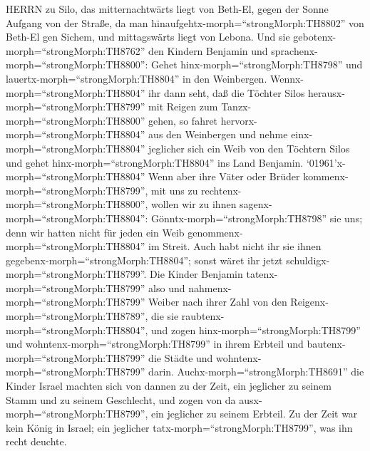 HERRN zu Silo, das mitternachtwärts liegt von Beth-El, gegen der Sonne
Aufgang von der Straße, da man hinaufgehtx-morph=``strongMorph:TH8802''
von Beth-El gen Sichem, und mittagswärts liegt von Lebona. 
Und sie gebotenx-morph=``strongMorph:TH8762'' den Kindern Benjamin und
sprachenx-morph=``strongMorph:TH8800'': Gehet
hinx-morph=``strongMorph:TH8798'' und
lauertx-morph=``strongMorph:TH8804'' in den Weinbergen. 
Wennx-morph=``strongMorph:TH8804'' ihr dann seht, daß die Töchter Silos
herausx-morph=``strongMorph:TH8799'' mit Reigen zum
Tanzx-morph=``strongMorph:TH8800'' gehen, so fahret
hervorx-morph=``strongMorph:TH8804'' aus den Weinbergen und nehme
einx-morph=``strongMorph:TH8804'' jeglicher sich ein Weib von den
Töchtern Silos und gehet hinx-morph=``strongMorph:TH8804'' ins Land
Benjamin.  `01961'\textbar x-morph=``strongMorph:TH8804''
Wenn aber ihre Väter oder Brüder kommenx-morph=``strongMorph:TH8799'',
mit uns zu rechtenx-morph=``strongMorph:TH8800'', wollen wir zu ihnen
sagenx-morph=``strongMorph:TH8804'': Gönntx-morph=``strongMorph:TH8798''
sie uns; denn wir hatten nicht für jeden ein Weib
genommenx-morph=``strongMorph:TH8804'' im Streit. Auch habt nicht ihr
sie ihnen gegebenx-morph=``strongMorph:TH8804''; sonst wäret ihr jetzt
schuldigx-morph=``strongMorph:TH8799''.  Die Kinder
Benjamin tatenx-morph=``strongMorph:TH8799'' also und
nahmenx-morph=``strongMorph:TH8799'' Weiber nach ihrer Zahl von den
Reigenx-morph=``strongMorph:TH8789'', die sie
raubtenx-morph=``strongMorph:TH8804'', und zogen
hinx-morph=``strongMorph:TH8799'' und
wohntenx-morph=``strongMorph:TH8799'' in ihrem Erbteil und
bautenx-morph=``strongMorph:TH8799'' die Städte und
wohntenx-morph=``strongMorph:TH8799'' darin. 
Auchx-morph=``strongMorph:TH8691'' die Kinder Israel machten sich von
dannen zu der Zeit, ein jeglicher zu seinem Stamm und zu seinem
Geschlecht, und zogen von da ausx-morph=``strongMorph:TH8799'', ein
jeglicher zu seinem Erbteil.  Zu der Zeit war kein König in
Israel; ein jeglicher tatx-morph=``strongMorph:TH8799'', was ihn recht
deuchte.
